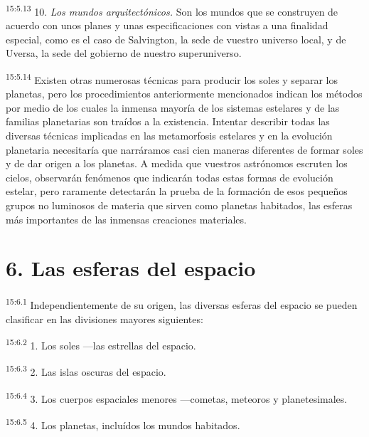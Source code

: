 \par
\textsuperscript{15:5.13} 10. \textit{Los mundos arquitectónicos.} Son los mundos que se construyen de acuerdo con unos planes y unas especificaciones con vistas a una finalidad especial, como es el caso de Salvington, la sede de vuestro universo local, y de Uversa, la sede del gobierno de nuestro superuniverso.

\par
\textsuperscript{15:5.14} Existen otras numerosas técnicas para producir los soles y separar los planetas, pero los procedimientos anteriormente mencionados indican los métodos por medio de los cuales la inmensa mayoría de los sistemas estelares y de las familias planetarias son traídos a la existencia. Intentar describir todas las diversas técnicas implicadas en las metamorfosis estelares y en la evolución planetaria necesitaría que narráramos casi cien maneras diferentes de formar soles y de dar origen a los planetas. A medida que vuestros astrónomos escruten los cielos, observarán fenómenos que indicarán todas estas formas de evolución estelar, pero raramente detectarán la prueba de la formación de esos pequeños grupos no luminosos de materia que sirven como planetas habitados, las esferas más importantes de las inmensas creaciones materiales.

\section*{6. Las esferas del espacio}
\par
\textsuperscript{15:6.1} Independientemente de su origen, las diversas esferas del espacio se pueden clasificar en las divisiones mayores siguientes:

\par
\textsuperscript{15:6.2} 1. Los soles ---las estrellas del espacio.

\par
\textsuperscript{15:6.3} 2. Las islas oscuras del espacio.

\par
\textsuperscript{15:6.4} 3. Los cuerpos espaciales menores ---cometas, meteoros y planetesimales.

\par
\textsuperscript{15:6.5} 4. Los planetas, incluídos los mundos habitados.

